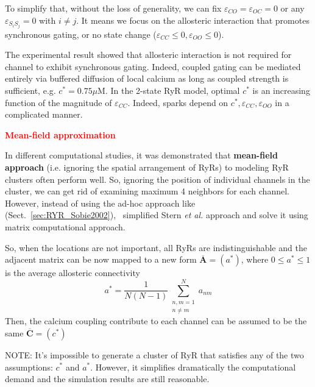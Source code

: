 To simplify that, without the loss of generality, we can fix
$\varepsilon_{CO}=\varepsilon_{OC}=0$ or any $\varepsilon_{S_iS_j}=0$
with $i\ne j$. It means we focus on the allosteric interaction that
promotes synchronous gating, or no state change ($\varepsilon_{CC}\le
0, \varepsilon_{OO}\le 0$).

The experimental result showed that allosteric interaction is not
required for channel to exhibit synchronous gating. Indeed, coupled
gating can be mediated entirely via buffered diffusion of local
calcium as long as coupled strength is sufficient,
e.g. $c^*=0.75\mu$M. In the 2-state RyR model, optimal $c^*$ is an
increasing function of the magnitude of $\varepsilon_{CC}$. Indeed,
sparks depend on $c^*, \varepsilon_{CC}, \varepsilon_{OO}$ in a
complicated manner. 

\textcolor{red}{\bf Mean-field approximation}

In different computational studies, it was demonstrated that
{\bf mean-field approach} (i.e. ignoring the spatial arrangement of
RyRs) to modeling RyR clusters often perform well. So, ignoring the
position of individual channels in the cluster, we can get rid of
examining maximum 4 neighbors for each channel. However, instead of
using the ad-hoc approach like ~\citep{sobie2002tcas}
(Sect.~\ref{sec:RYR_Sobie2002}),~\citep{groff2008} simplified Stern
{\it et al.} approach and solve it using matrix computational
approach.

So, when the locations are not important, all RyRs are
indistinguishable and the adjacent matrix can be now mapped to a new
form $\mathbf{\overline{A}}=(a^*)$, where $0\le a^*\le 1$ is the average
allosteric connectivity
\begin{equation}
  \label{eq:1150}
  a^* = \frac{1}{N(N-1)}\sum^N_{
    \begin{array}{l}
      n,m=1\\
      n\ne m
    \end{array}
  }
  a_{nm}
\end{equation}
Then, the calcium coupling contribute to each channel can be assumed
to be the same $\mathbf{\overline{C}} = (c^*)$

\begin{framed}
  NOTE: It's impossible to generate a cluster of RyR that satisfies
  any of the two assumptions: $c^*$ and $a^*$. However, it simplifies
  dramatically the computational demand and the simulation results are
  still reasonable.
\end{framed}

